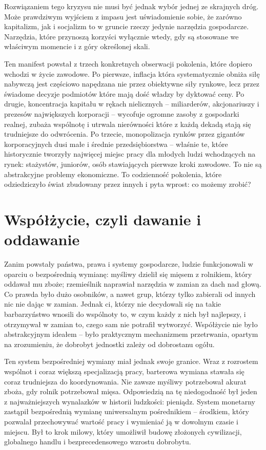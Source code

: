 \documentclass[12pt,a4paper]{article}
\begin{document}
Rozwiązaniem tego kryzysu nie musi być jednak  wybór jednej ze skrajnych
dróg. Może prawdziwym wyjściem z impasu jest uświadomienie sobie, że zarówno
kapitalizm, jak i socjalizm to w gruncie rzeczy jedynie narzędzia gospodarcze.
Narzędzia, które przynoszą korzyści wyłącznie wtedy, gdy są stosowane we
właściwym momencie i z góry określonej skali.

Ten manifest powstał z trzech konkretnych obserwacji pokolenia, które dopiero
wchodzi w życie zawodowe. Po pierwsze, inflacja która systematycznie
obniża siłę nabywczą jest częściowo napędzana nie przez obiektywne siły
rynkowe, lecz przez świadome decyzje podmiotów które mają dość władzy by
dyktować ceny. Po drugie, koncentracja kapitału w rękach nielicznych --
miliarderów, akcjonariuszy i prezesów największych korporacji -- wycofuje
ogromne zasoby z gospodarki realnej, zubaża wspólnotę i utrwala nierówności
które z każdą dekadą stają się trudniejsze do odwrócenia. Po trzecie,
monopolizacja rynków przez gigantów korporacyjnych dusi małe i średnie
przedsiębiorstwa -- właśnie te, które historycznie tworzyły najwięcej miejsc
pracy dla młodych ludzi wchodzących na rynek: stażystów, juniorów, osób
stawiających pierwsze kroki zawodowe. To nie są abstrakcyjne problemy
ekonomiczne. To codzienność pokolenia, które odziedziczyło świat zbudowany
przez innych i pyta wprost: co możemy zrobić?

\section*{Współżycie, czyli dawanie i oddawanie}

Zanim powstały państwa, prawa i systemy gospodarcze, ludzie funkcjonowali w oparciu o bezpośrednią wymianę: myśliwy dzielił się mięsem z rolnikiem, który oddawał mu zboże; rzemieślnik naprawiał narzędzia w zamian za dach nad głową. Co prawda było dużo osobników, a nawet grup, którzy tylko zabierali od innych nic nie dając w zamian. Jednak ci, którzy nie decydowali się na takie barbarzyństwo wnosili do wspólnoty to, w czym  każdy z nich był najlepszy, i otrzymywał w zamian to, czego sam nie potrafił wytworzyć. Współżycie nie było abstrakcyjnym ideałem -- było praktycznym mechanizmem przetrwania, opartym na zrozumieniu, że dobrobyt jednostki zależy od dobrostanu ogółu.

Ten system bezpośredniej wymiany miał jednak swoje granice. Wraz z rozrostem wspólnot i coraz większą specjalizacją pracy, barterowa wymiana stawała się coraz trudniejsza do koordynowania. Nie zawsze myśliwy potrzebował akurat zboża, gdy rolnik potrzebował mięsa. Odpowiedzią na tę niedogodność był jeden z najważniejszych wynalazków w historii ludzkości: pieniądz. System monetarny zastąpił bezpośrednią wymianę uniwersalnym pośrednikiem -- środkiem, który pozwalał przechowywać wartość pracy i wymieniać ją w dowolnym czasie i miejscu. Był to krok milowy, który umożliwił budowę złożonych cywilizacji, globalnego handlu i bezprecedensowego wzrostu dobrobytu.
\end{document}
